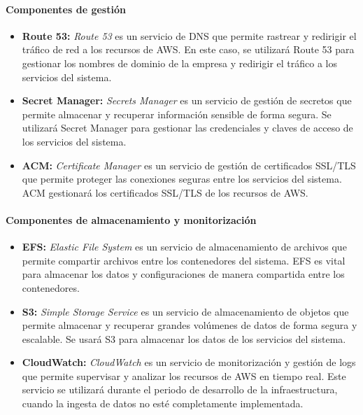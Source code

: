 \newpage{}
\paragraph{Componentes de gestión}
\begin{itemize}
	\item \textbf{Route 53:} \textit{Route 53} es un servicio de DNS que permite
		rastrear y redirigir el tráfico de red a los recursos de AWS. En este
		caso, se utilizará Route 53 para gestionar los nombres de dominio de la
		empresa y redirigir el tráfico a los servicios del sistema.
	\item \textbf{Secret Manager:} \textit{Secrets Manager} es un servicio de
		gestión de secretos que permite almacenar y recuperar información
		sensible de forma segura. Se utilizará Secret Manager para
		gestionar las credenciales y claves de acceso de los servicios del
		sistema.
	\item \textbf{ACM:} \textit{Certificate Manager} es un servicio de gestión
		de certificados SSL/TLS que permite proteger las conexiones seguras
		entre los servicios del sistema. ACM gestionará los certificados SSL/TLS
		de los recursos de AWS.
\end{itemize}

\paragraph{Componentes de almacenamiento y monitorización}
\begin{itemize}
	\item \textbf{EFS:} \textit{Elastic File System} es un servicio de
		almacenamiento de archivos que permite compartir archivos entre los
		contenedores del sistema. EFS es vital para almacenar los datos y
		configuraciones de manera compartida entre los contenedores.
	\item \textbf{S3:} \textit{Simple Storage Service} es un servicio de
		almacenamiento de objetos que permite almacenar y recuperar grandes
		volúmenes de datos de forma segura y escalable. Se usará S3 para
		almacenar los datos de los servicios del sistema.
	\item \textbf{CloudWatch:} \textit{CloudWatch} es un servicio de
		monitorización y gestión de logs que permite supervisar y analizar los
		recursos de AWS en tiempo real. Este servicio se utilizará durante el
		periodo de desarrollo de la infraestructura, cuando la ingesta de datos
		no esté completamente implementada.
\end{itemize}

